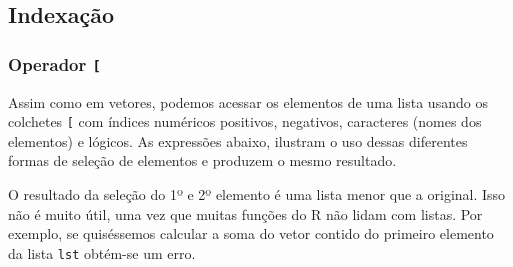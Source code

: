 \documentclass[]{book}
\newenvironment{Shaded}{\begin{snugshade}}{\end{snugshade}}
\newcommand{\KeywordTok}[1]{\textcolor[rgb]{0.13,0.29,0.53}{\textbf{#1}}}
\newcommand{\DecValTok}[1]{\textcolor[rgb]{0.00,0.00,0.81}{#1}}
\newcommand{\StringTok}[1]{\textcolor[rgb]{0.31,0.60,0.02}{#1}}
\newcommand{\CommentTok}[1]{\textcolor[rgb]{0.56,0.35,0.01}{\textit{#1}}}
\newcommand{\OperatorTok}[1]{\textcolor[rgb]{0.81,0.36,0.00}{\textbf{#1}}}
\newcommand{\NormalTok}[1]{#1}
\begin{document}
\subsection{Indexação}\label{indexacao-1}

\subsubsection{\texorpdfstring{Operador
\texttt{{[}}}{Operador {[}}}\label{operador}

Assim como em vetores, podemos acessar os elementos de uma lista usando
os colchetes \texttt{{[}} com índices numéricos positivos, negativos,
caracteres (nomes dos elementos) e lógicos. As expressões abaixo,
ilustram o uso dessas diferentes formas de seleção de elementos e
produzem o mesmo resultado.

\begin{Shaded}
\end{Shaded}

O resultado da seleção do 1º e 2º elemento é uma lista menor que a
original. Isso não é muito útil, uma vez que muitas funções do R não
lidam com listas. Por exemplo, se quiséssemos calcular a soma do vetor
contido do primeiro elemento da lista \texttt{lst} obtém-se um erro.

\begin{Shaded}
\end{Shaded}
\end{document}
